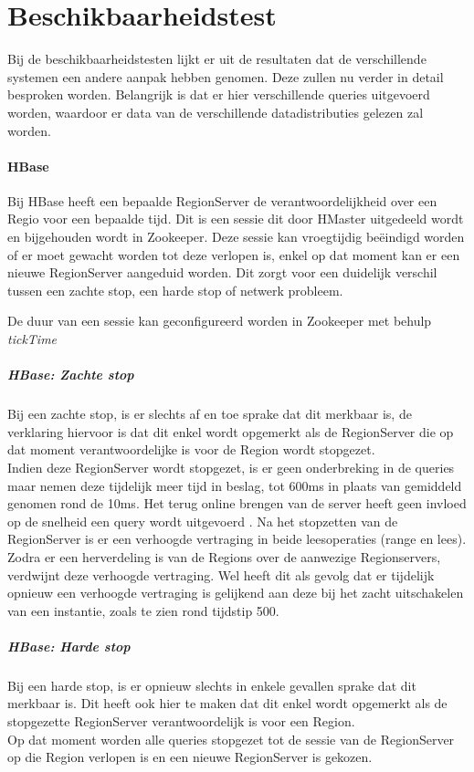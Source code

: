 \section{Beschikbaarheidstest}
Bij de beschikbaarheidstesten lijkt er uit de resultaten dat de verschillende systemen een andere aanpak hebben genomen. Deze zullen nu verder in detail besproken worden. Belangrijk  is dat er hier verschillende queries uitgevoerd worden, waardoor er data van de verschillende datadistributies gelezen zal worden. 

\paragraph{HBase} Bij HBase heeft een bepaalde RegionServer de verantwoordelijkheid over een Regio voor een bepaalde tijd. Dit is een sessie dit door HMaster uitgedeeld wordt en bijgehouden wordt in Zookeeper. Deze sessie kan vroegtijdig beëindigd worden of er moet gewacht worden tot deze verlopen is, enkel op dat moment kan er een nieuwe RegionServer aangeduid worden. Dit zorgt voor een duidelijk verschil tussen een zachte stop, een harde stop of netwerk probleem. 

De duur van een sessie kan geconfigureerd worden in Zookeeper met behulp \textit{tickTime} 

\subparagraph{HBase: Zachte stop} Bij een zachte stop, is er slechts af en toe sprake dat dit merkbaar is, de verklaring hiervoor is dat dit enkel wordt opgemerkt als de RegionServer die op dat moment verantwoordelijke is voor de Region wordt stopgezet. \\
Indien deze RegionServer wordt stopgezet, is er geen onderbreking in de queries maar nemen deze tijdelijk meer tijd in beslag, tot 600ms in plaats van gemiddeld genomen rond de 10ms.  Het terug online brengen van de server heeft geen invloed op de snelheid een query wordt uitgevoerd . Na het stopzetten van de RegionServer is er een verhoogde vertraging in beide leesoperaties (range en lees). \\
Zodra er een herverdeling is van de Regions over de aanwezige Regionservers, verdwijnt deze verhoogde vertraging. Wel heeft dit als gevolg dat er tijdelijk opnieuw een verhoogde vertraging is gelijkend aan deze bij het zacht uitschakelen van een instantie, zoals te zien rond tijdstip 500. 

\subparagraph{HBase: Harde stop} Bij een harde stop, is er opnieuw slechts in enkele gevallen sprake dat dit merkbaar is. Dit heeft ook hier te maken dat dit enkel wordt opgemerkt als de stopgezette RegionServer verantwoordelijk is voor een Region. \\
Op dat moment worden alle queries stopgezet tot de sessie van de RegionServer op die Region verlopen is en een nieuwe RegionServer is gekozen. 

